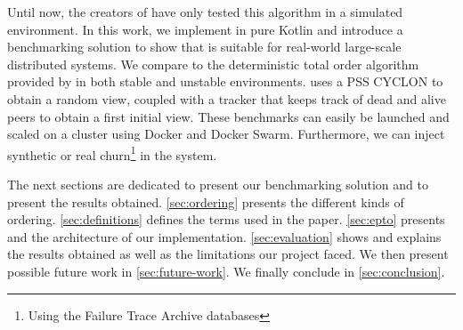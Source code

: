 \par
Until now, the creators of \epto have only tested this algorithm in a simulated environment. In this work, we implement \epto in pure Kotlin and introduce a benchmarking solution to show that \epto is suitable for real-world large-scale distributed systems. We compare \epto to the deterministic total order algorithm provided by \jgroups \autocite{jgroups} in both stable and unstable environments. \epto uses a PSS CYCLON \autocite{Voulgaris2005} to obtain a random view, coupled with a tracker that keeps track of dead and alive peers to obtain a first initial view. These benchmarks can easily be launched and scaled on a cluster using Docker and Docker Swarm. Furthermore, we can inject synthetic or real churn\footnote{Using the Failure Trace Archive databases} in the system.
\par
The next sections are dedicated to present our benchmarking solution and to present the results obtained. \autoref{sec:ordering} presents the different kinds of ordering. \autoref{sec:definitions} defines the terms used in the paper. \autoref{sec:epto} presents \epto and the architecture of our implementation. \autoref{sec:evaluation} shows and explains the results obtained as well as the limitations our project faced. We then present possible future work in \autoref{sec:future-work}. We finally conclude in \autoref{sec:conclusion}.